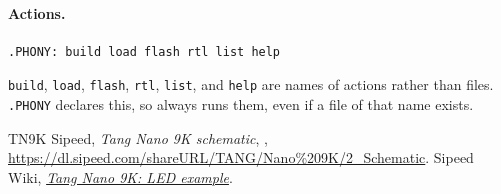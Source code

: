 \documentclass[11pt,a4paper]{article}
\begin{document}
\paragraph{Actions.}

\begin{verbatim}
.PHONY: build load flash rtl list help
\end{verbatim}

\texttt{build}, \texttt{load}, \texttt{flash}, \texttt{rtl}, \texttt{list}, and \texttt{help} are names of actions rather than files. \texttt{.PHONY} declares this, so  always runs them, even if a file of that name exists.

\begin{thebibliography}{TN9K}
 Sipeed, \textit{Tang Nano 9K schematic}, , \url{https://dl.sipeed.com/shareURL/TANG/Nano%209K/2_Schematic}.
 Sipeed Wiki, \href{https://wiki.sipeed.com/hardware/en/tang/Tang-Nano-9K/examples/led.html}{\textit{Tang Nano 9K: LED example}}.
\end{thebibliography}

\revisiontable
\end{document}
